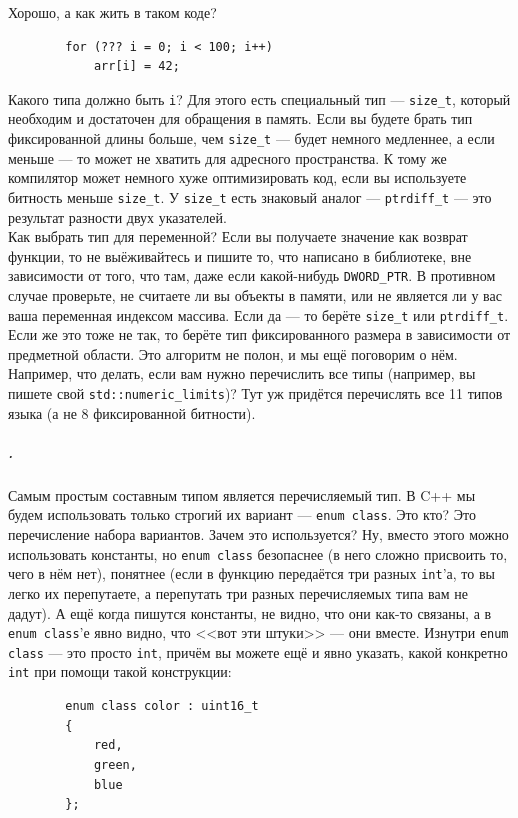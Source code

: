 \documentclass{article}
\begin{document}
    Хорошо, а как жить в таком коде?
    \begin{verbatim}
        for (??? i = 0; i < 100; i++)
            arr[i] = 42;
    \end{verbatim}
    Какого типа должно быть \texttt{i}? Для этого есть специальный тип --- \texttt{size_t}, который необходим и достаточен для обращения в память. Если вы будете брать тип фиксированной длины больше, чем \texttt{size_t} --- будет немного медленнее, а если меньше --- то может не хватить для адресного пространства. К тому же компилятор может немного хуже оптимизировать код, если вы используете битность меньше \texttt{size_t}. У \texttt{size_t} есть знаковый аналог --- \texttt{ptrdiff_t} --- это результат разности двух указателей.\\
    Как выбрать тип для переменной? Если вы получаете значение как возврат функции, то не выёживайтесь и пишите то, что написано в библиотеке, вне зависимости от того, что там, даже если какой-нибудь \texttt{DWORD_PTR}. В противном случае проверьте, не считаете ли вы объекты в памяти, или не является ли у вас ваша переменная индексом массива. Если да --- то берёте \texttt{size_t} или \texttt{ptrdiff_t}. Если же это тоже не так, то берёте тип фиксированного размера в зависимости от предметной области. Это алгоритм не полон, и мы ещё поговорим о нём. Например, что делать, если вам нужно перечислить все типы (например, вы пишете свой \texttt{std::numeric_limits})? Тут уж придётся перечислять все 11 типов языка (а не 8 фиксированной битности).
    \subparagraph{.}
    Самым простым составным типом является перечисляемый тип. В C++ мы будем использовать только строгий их вариант --- \texttt{enum class}. Это кто? Это перечисление набора вариантов. Зачем это используется? Ну, вместо этого можно использовать константы, но \texttt{enum class} безопаснее (в него сложно присвоить то, чего в нём нет), понятнее (если в функцию передаётся три разных \texttt{int}'а, то вы легко их перепутаете, а перепутать три разных перечисляемых типа вам не дадут). А ещё когда пишутся константы, не видно, что они как-то связаны, а в \texttt{enum class}'е явно видно, что <<вот эти штуки>> --- они вместе. Изнутри \texttt{enum class} --- это просто \texttt{int}, причём вы можете ещё и явно указать, какой конкретно \texttt{int} при помощи такой конструкции:
    \begin{verbatim}
        enum class color : uint16_t
        {
            red,
            green,
            blue
        };
    \end{verbatim}
\end{document}
